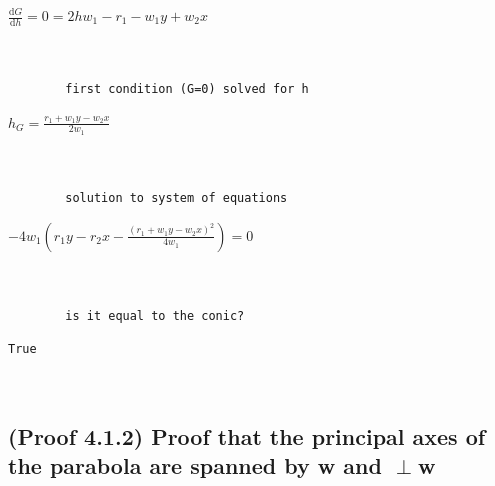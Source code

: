 \documentclass[11pt]{article}
\begin{document}
            $\displaystyle \frac{\mathrm{d}G}{\mathrm{d}h} = 0 = 2 h w_{1} - r_{1} - w_{1} y + w_{2} x$

            
            \begin{Verbatim}[commandchars=\\\{\}]


        first condition (G=0) solved for h
            \end{Verbatim}

            $\displaystyle h_{G} = \frac{r_{1} + w_{1} y - w_{2} x}{2 w_{1}}$

            
            \begin{Verbatim}[commandchars=\\\{\}]


        solution to system of equations
            \end{Verbatim}

            $\displaystyle - 4 w_{1} \left(r_{1} y - r_{2} x - \frac{\left(r_{1} + w_{1} y - w_{2} x\right)^{2}}{4 w_{1}}\right) = 0$

            
            \begin{Verbatim}[commandchars=\\\{\}]


        is it equal to the conic?
            \end{Verbatim}

            
            \begin{Verbatim}[commandchars=\\\{\}]
        True
            \end{Verbatim}

            
            \begin{Verbatim}[commandchars=\\\{\}]


            \end{Verbatim}

    \subsection{(Proof 4.1.2) Proof that the principal axes of the parabola are spanned by w and $\perp$w}\label{proof-that-the-principal-axes-of-the-parabola-are-spanned-by-w-and-w}
\end{document}
